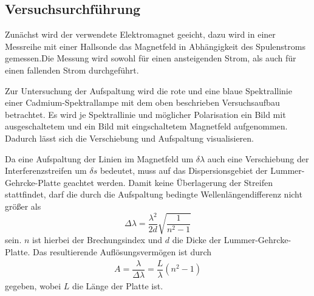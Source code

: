 \subsection{Versuchsurchführung}
Zunächst wird der verwendete Elektromagnet geeicht, dazu wird in einer Messreihe mit einer Hallsonde
das Magnetfeld in Abhängigkeit des Spulenstroms gemessen.Die Messung wird sowohl für einen ansteigenden
Strom, als auch für einen fallenden Strom durchgeführt.

Zur Untersuchung der Aufspaltung wird die rote und eine blaue Spektrallinie einer Cadmium-Spektrallampe
mit dem oben beschrieben Versuchsaufbau betrachtet. Es wird je Spektrallinie und möglicher Polarisation ein Bild
mit ausgeschaltetem und ein Bild mit eingschaltetem Magnetfeld aufgenommen. Dadurch lässt sich die Verschiebung
und Aufspaltung visualisieren.

Da eine Aufspaltung der Linien im Magnetfeld um $\delta\lambda$ auch eine Verschiebung der Interferenzstreifen um $\delta s$
bedeutet, muss auf das Dispersionsgebiet der Lummer-Gehrcke-Platte geachtet werden. Damit keine Überlagerung der Streifen
stattfindet, darf die durch die Aufspaltung bedingte Wellenlängendifferenz nicht größer als
\begin{equation}
  \label{eqn:disper}
    \Delta\lambda=\dfrac{\lambda^2}{2d}\sqrt{\dfrac{1}{n^2-1}}
\end{equation}
sein.
$n$ ist hierbei der Brechungsindex und $d$ die Dicke der Lummer-Gehrcke-Platte.
Das resultierende Auflösungsvermögen ist durch
\begin{align}
    A=\dfrac{\lambda}{\Delta\lambda}=\dfrac{L}{\lambda}(n^2-1)
\end{align}
gegeben, wobei $L$ die Länge der Platte ist.
